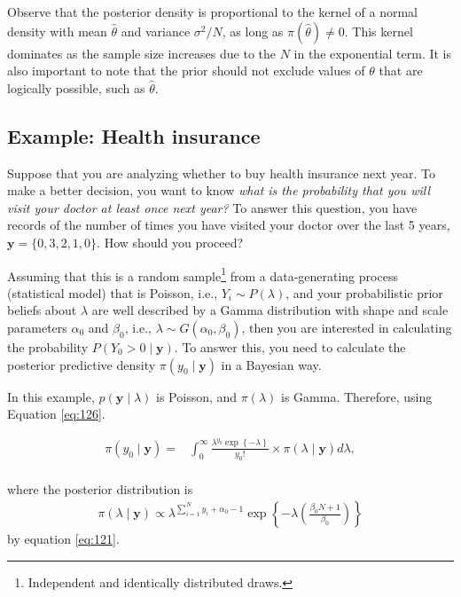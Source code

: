 Observe that the posterior density is proportional to the kernel of a normal density with mean $\hat{\theta}$ and variance $\sigma^2 / N$, as long as $\pi(\hat{\theta}) \neq 0$. This kernel dominates as the sample size increases due to the $N$ in the exponential term. It is also important to note that the prior should not exclude values of $\theta$ that are logically possible, such as $\hat{\theta}$.

\subsection{Example: Health insurance}\label{sec121}
Suppose that you are analyzing whether to buy health insurance next year. To make a better decision, you want to know \textit{what is the probability that you will visit your doctor at least once next year?} To answer this question, you have records of the number of times you have visited your doctor over the last 5 years, \( \mathbf{y} = \{0, 3, 2, 1, 0\} \). How should you proceed?

Assuming that this is a random sample\footnote{Independent and identically distributed draws.} from a data-generating process (statistical model) that is Poisson, i.e., \( Y_i \sim P(\lambda) \), and your probabilistic prior beliefs about \( \lambda \) are well described by a Gamma distribution with shape and scale parameters \( \alpha_0 \) and \( \beta_0 \), i.e., \( \lambda \sim G(\alpha_0, \beta_0) \), then you are interested in calculating the probability \( P(Y_0 > 0 \mid \mathbf{y}) \). To answer this, you need to calculate the posterior predictive density \( \pi(y_0 \mid \mathbf{y}) \) in a Bayesian way.

In this example, \( p(\mathbf{y} \mid \lambda) \) is Poisson, and \( \pi(\lambda) \) is Gamma. Therefore, using Equation \ref{eq:126}.


\begin{align*}
	\pi(y_0\mid \mathbf{y})=&\int_{0}^{\infty}\frac{\lambda^{y_0}\exp\left\{-\lambda\right\}}{y_0!}\times \pi(\lambda\mid \mathbf{y})d\lambda,\\
\end{align*}

where the posterior distribution is 
\begin{align*}
\pi(\lambda\mid \mathbf{y})\propto \lambda^{\sum_{i=1}^N y_i + \alpha_0 - 1}\exp\left\{-\lambda\left(\frac{\beta_0 N+1}{\beta_0}\right)\right\}
\end{align*}
by equation \ref{eq:121}.


